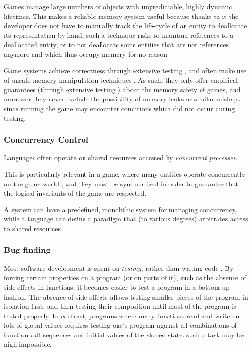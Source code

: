 Games manage large numbers of objects with unpredictable, highly dynamic lifetimes. This makes a reliable memory system useful because thanks to it the developer does not have to manually track the life-cycle of an entity to deallocate its representation by hand; such a technique risks to maintain references to a deallocated entity, or to not deallocate some entities that are not references anymore and which thus occupy memory for no reason.

Game systems achieve correctness through extensive testing \cite{CHAPTER_1_PATCHING_CYCLES}, and often make use of unsafe memory manipulation techniques \cite{CHAPTER_1_POINTER_ARITHMETICS_IN_GAME}. As such, they only offer empirical guarantees (through extensive testing \cite{CHAPTER_1_TESTING_DOES_NOT_WORK}) about the memory safety of games, and moreover they never exclude the possibility of memory leaks or similar mishaps since running the game may encounter conditions which did not occur during testing.

\subsubsection{Concurrency Control}
Languages often operate on shared resources accessed by \textit{concurrent processes}.

This is particularly relevant in a game, where many entities operate concurrently on the game world \cite{CHAPTER_1_GAMES_ARE_CONCURRENT}, and they must be synchronized in order to guarantee that the logical invariants of the game are respected.

A system can have a predefined, monolithic system for managing concurrency, while a language can define a paradigm that (to various degrees) arbitrates access to shared resources \cite{CHAPTER_1_PL_AND_RESOURCE_SHARING}.

\subsubsection{Bug finding}
Most software development is spent on \textit{testing}, rather than writing code \cite{CHAPTER_1_TESTING_MORE_THAN_WRITING}. By forcing certain properties on a program (or on parts of it), such as the absence of side-effects in functions, it becomes easier to test a program in a bottom-up fashion. The absence of side-effects allows testing smaller pieces of the program in isolation first, and then testing their composition until most of the program is tested properly. In contrast, programs where many functions read and write on lots of global values requires testing one's program against all combinations of function call sequences and initial values of the shared state: such a task may be nigh impossible.

